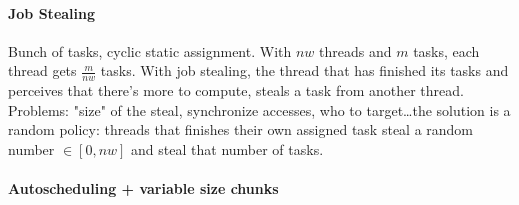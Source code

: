 \documentclass[10pt]{report}
\begin{document}
\paragraph{Job Stealing} Bunch of tasks, cyclic static assignment. With $nw$ threads and $m$ tasks, each thread gets $\frac{m}{nw}$ tasks. With job stealing, the thread that has finished its tasks and perceives that there's more to compute, steals a task from another thread. Problems: "size" of the steal, synchronize accesses, who to target\ldots the solution is a random policy: threads that finishes their own assigned task steal a random number $\in[0, nw]$ and steal that number of tasks.
\paragraph{Autoscheduling + variable size chunks}
\end{document}
